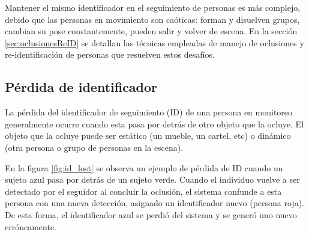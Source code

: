 Mantener el mismo identificador en el seguimiento de personas es más complejo, debido que las personas en movimiento son caóticas: forman y disuelven grupos, cambian su pose constantemente, pueden salir y volver de escena. En la sección \ref{sec:oclusionesReID} se detallan las técnicas empleadas de manejo de oclusiones y re-identificación de personas que resuelven estos desafíos.

\subsection{Pérdida de identificador}

La pérdida del identificador de seguimiento (ID) de una persona en monitoreo generalmente ocurre cuando esta pasa por detrás de otro objeto que la ocluye. El objeto que la ocluye puede ser estático (un mueble, un cartel, etc) o dinámico (otra persona o grupo de personas en la escena).

En la figura \ref{fig:id_lost} se observa un ejemplo de pérdida de ID cuando un sujeto azul pasa por detrás de un sujeto verde. Cuando el individuo vuelve a ser detectado por el seguidor al concluir la oclusión, el sistema confunde a esta persona con una nueva detección, asignado un identificador nuevo (persona roja). De esta forma, el identificador azul se perdió del sistema y se generó uno nuevo erróneamente.

